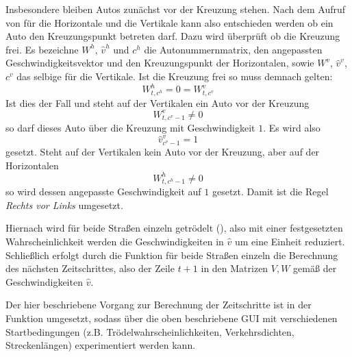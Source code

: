 Insbesondere bleiben Autos zunächst vor der Kreuzung stehen. Nach dem Aufruf von  für die
Horizontale und die Vertikale kann also entschieden werden ob ein Auto den Kreuzungspunkt betreten darf. 
Dazu wird überprüft ob die Kreuzung frei. Es bezeichne \(W^h\), \(\hat{v}^h\) und \(c^h\) 
die Autonummernmatrix, den angepassten Geschwindigkeitsvektor und den Kreuzungspunkt der Horizontalen, sowie
\(W^v\), \(\hat{v}^v\), \(c^v\) das selbige für die Vertikale. Ist die Kreuzung frei so muss demnach gelten: 
\[W^h_{t,c^h} = 0 = W^v_{t,c^v}\] 
Ist dies der Fall und steht auf der Vertikalen
ein Auto vor der Kreuzung 
\[W^v_{t,c^v-1} \neq 0\] so darf dieses Auto über die Kreuzung mit Geschwindigkeit \(1\). 
Es wird also 
\[\hat{v}^v_{c^v-1} = 1\] 
gesetzt. Steht auf der Vertikalen kein Auto vor der Kreuzung, 
aber auf der Horizontalen 
\[W^h_{t,c^h-1} \neq 0\]
so wird dessen angepasste Geschwindigkeit auf \(1\) gesetzt. 
Damit ist die Regel \textit{Rechts vor Links} umgesetzt.

Hiernach wird für beide Straßen einzeln getrödelt (), also mit einer festgesetzten Wahrscheinlichkeit werden
die Geschwindigkeiten in \(\hat{v}\) um eine Einheit reduziert. 
Schließlich erfolgt durch die Funktion  für beide Straßen einzeln die Berechnung des nächsten Zeitschrittes, 
also der Zeile \(t+1\) in den Matrizen \(V,W\) gemäß der Geschwindigkeiten \(\hat{v}\).

Der hier beschriebene Vorgang zur Berechnung der Zeitschritte ist in der Funktion  umgesetzt, 
sodass über die oben beschriebene GUI mit verschiedenen Startbedingungen (z.B. Trödelwahrscheinlichkeiten, Verkehrsdichten, Streckenlängen) experimentiert werden kann.

